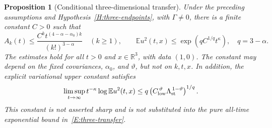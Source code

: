 \documentclass[12pt]{article}
\numberwithin{equation}{section}
\newtheorem{proposition}[theorem]{Proposition}
\theoremstyle{definition}
\newcommand{\R}{\mathbb{R}}
\newcommand{\E}{\mathbb{E}}
\begin{document}
\begin{proposition}[Conditional three-dimensional transfer]
  \label{P:three-transfer}
  Under the preceding assumptions and Hypothesis~\ref{H:three-endpoints},
  with $\Gamma\ne0$, there is a finite constant $C>0$ such that
  \begin{equation}\label{E:three-transfer}
    A_k(t)\le\frac{C^kt^{(4-\alpha-\alpha_0)k}}{(k!)^{3-\alpha}}
    \quad(k\ge1),\qquad
    \E u^2(t,x)\le\exp\left(qC^{1/q}t^\kappa\right),
    \quad q=3-\alpha.
  \end{equation}
  The estimates hold for all $t>0$ and $x\in\R^3$, with data $(1,0)$.
  The constant may depend on the fixed covariances, $\alpha_0$, and
  $\vartheta$, but not on $k,t,x$. In addition, the explicit variational
  upper constant satisfies
  \begin{equation}\label{E:three-variational-upper}
    \limsup_{t\to\infty}t^{-\kappa}\log\E u^2(t,x)
    \le q\left(C_{\rm low}^{\,\vartheta}
    \Lambda_{\rm st}^{\,1-\vartheta}\right)^{1/q}.
  \end{equation}
  This constant is not asserted sharp and is not substituted into the
  pure all-time exponential bound in~\eqref{E:three-transfer}.
\end{proposition}
\end{document}
